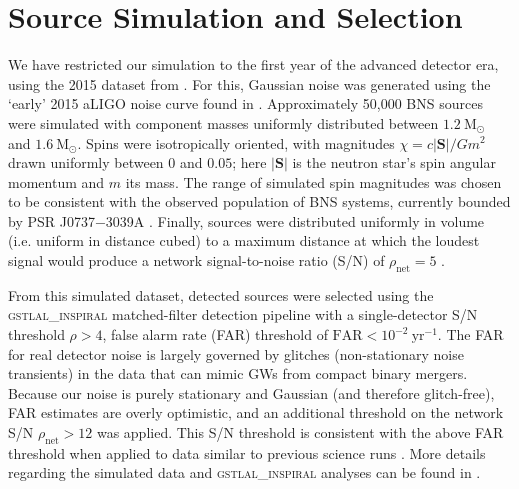 \section{Source Simulation and Selection}

We have restricted our simulation to the first year of the advanced detector era, using the 2015 dataset from \citet{Singer_2014}.  For this, Gaussian noise was generated using the `early' 2015 aLIGO noise curve found in \citet{Barsotti:2012}.  Approximately 50,000 BNS sources were simulated with component masses uniformly distributed between $1.2~\mathrm{M}_\odot$ and $1.6~\mathrm{M}_\odot$.  Spins were isotropically oriented, with magnitudes $\chi = c |\mathbf{S}|/G m^2$ drawn uniformly between $0$ and $0.05$; here $|\mathbf{S}|$ is the neutron star's spin angular momentum and $m$ its mass.  The range of simulated spin magnitudes was chosen to be consistent with the observed population of BNS systems, currently bounded by PSR J0737$-$3039A \citep{Burgay_2003,Brown_2012}.  Finally, sources were distributed uniformly in volume (i.e. uniform in distance cubed) to a maximum distance at which the loudest signal would produce a network signal-to-noise ratio (S/N) of $\rho_\mathrm{net} = 5$ \citep{Singer_2014}.

From this simulated dataset, detected sources were selected using the \textsc{gstlal\_inspiral} matched-filter detection pipeline \citep{Cannon_2012} with a single-detector S/N threshold $\rho>4$, false alarm rate (FAR) threshold of $\mathrm{FAR}<10^{-2}~\mathrm{yr}^{-1}$.  The FAR for real detector noise is largely governed by glitches (non-stationary noise transients) in the data that can mimic GWs from compact binary mergers.  Because our noise is purely stationary and Gaussian (and therefore glitch-free), FAR estimates are overly optimistic, and an additional threshold on the network S/N $\rho_\mathrm{net} > 12$ was applied.  This S/N threshold is consistent with the above FAR threshold when applied to data similar to previous science runs \cite{2013arXiv1304.0670L,Berry_2014}.  More details regarding the simulated data and \textsc{gstlal\_inspiral} analyses can be found in \citet{Singer_2014}.